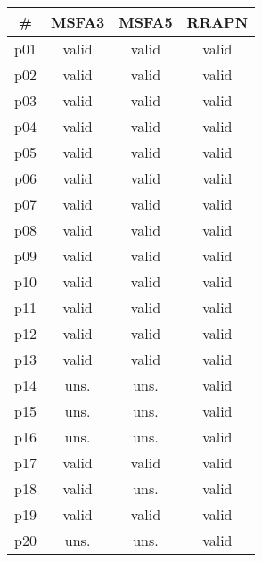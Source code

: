 \begin{tabular}{c||c|c|c}
\textbf{\#} & \textbf{MSFA3} & \textbf{MSFA5} & \textbf{RRAPN}\\
\hline
\hline
p01 & valid & valid & valid\\
p02 & valid & valid & valid\\
p03 & valid & valid & valid\\
p04 & valid & valid & valid\\
p05 & valid & valid & valid\\
p06 & valid & valid & valid\\
p07 & valid & valid & valid\\
p08 & valid & valid & valid\\
p09 & valid & valid & valid\\
p10 & valid & valid & valid\\
p11 & valid & valid & valid\\
p12 & valid & valid & valid\\
p13 & valid & valid & valid\\
p14 & uns. & uns. & valid\\
p15 & uns. & uns. & valid\\
p16 & uns. & uns. & valid\\
p17 & valid & valid & valid\\
p18 & valid & uns. & valid\\
p19 & valid & valid & valid\\
p20 & uns. & uns. & valid\\
\end{tabular}

